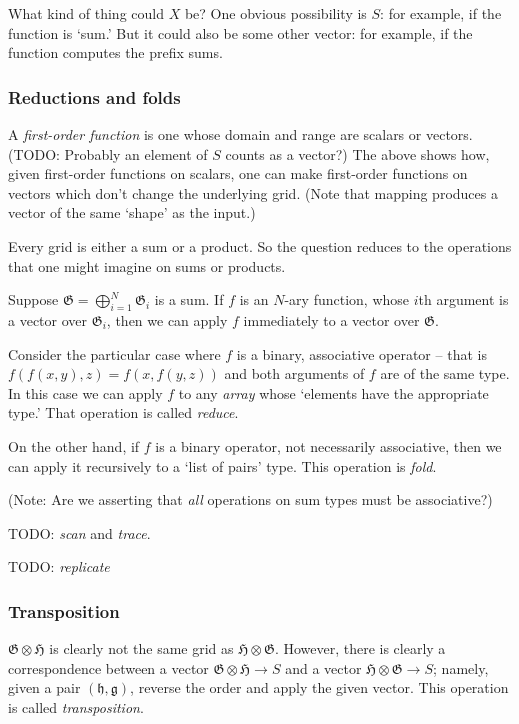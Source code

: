 \documentclass[11pt]{article}
\newcommand{\gr}[1]{\mathfrak{#1}}
\begin{document}
What kind of thing could \(X\) be? One obvious possibility is \(S\): for example, if
the function is ‘sum.’ But it could also be some other vector: for example, if
the function computes the prefix sums. 

\subsubsection{Reductions and folds}
\label{sec:org1f2a8ac}

A  \emph{first-order  function}  is  one  whose  domain  and  range  are  scalars  or
vectors. (TODO: Probably an element of \(S\)  counts as a vector?) The above shows
how, given first-order functions on  scalars, one can make first-order functions
on vectors which don't change the underlying grid. (Note that mapping produces a
vector of the same `shape' as the input.)

Every grid is either a sum or a product. So the question reduces to the
operations that one might imagine on sums or products. 

Suppose \(\gr{G} = \bigoplus_{i = 1}^N \gr{G}_i\) is a sum. If \(f\) is an \(N\)-ary
function, whose \(i\)th argument is a vector over \(\gr{G}_i\), then we can apply
\(f\) immediately to a vector over \(\gr{G}\).

Consider the particular case where \(f\) is a binary, associative operator -- that
is \(f(f(x, y), z) = f(x, f(y, z))\) and both arguments of \(f\) are of the same
type. In this case we can apply \(f\) to any \emph{array} whose ‘elements have the
appropriate type.’ That operation is called \emph{reduce}.

On the other hand, if \(f\) is a binary operator, not necessarily associative,
then we can apply it recursively to a ‘list of pairs’ type. This operation is
\emph{fold}.

(Note: Are we asserting that \emph{all} operations on sum types must be associative?)

TODO: \emph{scan} and \emph{trace}. 

TODO: \emph{replicate}

\subsubsection{Transposition}
\label{sec:org68e418b}

\(\gr{G}\otimes\gr{H}\) is clearly not the same grid as
\(\gr{H}\otimes\gr{G}\). However, there is clearly a correspondence between a
vector \(\gr{G}\otimes\gr{H}\to S\) and a vector \(\gr{H}\otimes\gr{G}\to
S\); namely, given a pair \((\gr{h}, \gr{g})\), reverse the order and apply the
given vector. This operation is called \emph{transposition}. 
\end{document}
